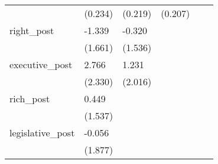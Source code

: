 \begin{table}[h]
{\begin{threeparttable}
\begin{tabular}{l*{5}{l}}
&     (0.234)         &     (0.219)         &     (0.207)         &                     &                     \\
right\_post          &      -1.339         &      -0.320         &                     &                     &                     \\
&     (1.661)         &     (1.536)         &                     &                     &                     \\
executive\_post      &       2.766         &       1.231         &                     &                     &                     \\
&     (2.330)         &     (2.016)         &                     &                     &                     \\
rich\_post           &       0.449         &                     &                     &                     &                     \\
&     (1.537)         &                     &                     &                     &                     \\
legislative\_post    &      -0.056         &                     &                     &                     &                     \\
&     (1.877)         &                     &                     &                     &                     \\

\end{tabular}
\end{threeparttable}}
\end{table}
